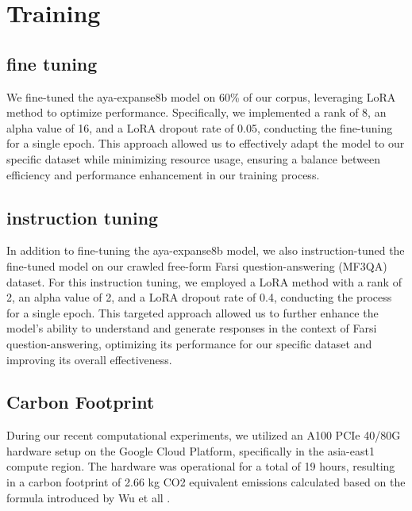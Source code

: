 \documentclass[conference]{IEEEtran}
\begin{document}
\section{Training}
\subsection{fine tuning}
We fine-tuned the aya-expanse8b model on 60\% of our corpus, leveraging LoRA
\cite{b12}
method to optimize performance. Specifically, we implemented a rank of 8, an alpha value of 16, and a LoRA dropout rate of 0.05, conducting the fine-tuning for a single epoch. This approach allowed us to effectively adapt the model to our specific dataset while minimizing resource usage, ensuring a balance between efficiency and performance enhancement in our training process.
\subsection{instruction tuning}
In addition to fine-tuning the aya-expanse8b model, we also instruction-tuned the fine-tuned model on our crawled free-form Farsi question-answering (MF3QA) dataset. For this instruction tuning, we employed a LoRA method with a rank of 2, an alpha value of 2, and a LoRA dropout rate of 0.4, conducting the process for a single epoch. This targeted approach allowed us to further enhance the model’s ability to understand and generate responses in the context of Farsi question-answering, optimizing its performance for our specific dataset and improving its overall effectiveness.
\subsection{Carbon Footprint}
During our recent computational experiments, we utilized an A100 PCIe 40/80G hardware setup on the Google Cloud Platform, specifically in the asia-east1 compute region. The hardware was operational for a total of 19 hours, resulting in a carbon footprint of 2.66 kg CO2 equivalent emissions calculated  based on the formula introduced by Wu et all
\cite{b13}
.
\end{document}
